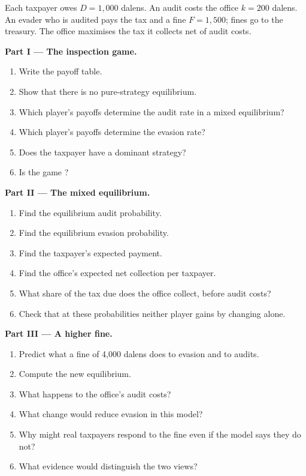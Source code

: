 \begin{problem}
\label{pb:b2:mixed-strategies:1}
Each taxpayer owes $D = 1{,}000$ dalens. An audit costs the office $k = 200$ dalens. An evader who is audited pays
the tax and a fine $F = 1{,}500$; fines go to the treasury. The office maximises the tax it collects net of audit
costs.

\medskip
\noindent\textbf{Part I --- The inspection game.}
\begin{enumerate}
  \item Write the payoff table.
  \item Show that there is no pure-strategy equilibrium.
  \item Which player's payoffs determine the audit rate in a mixed equilibrium?
  \item Which player's payoffs determine the evasion rate?
  \item Does the taxpayer have a dominant strategy?
  \item Is the game ?
\end{enumerate}

\medskip
\noindent\textbf{Part II --- The mixed equilibrium.}
\begin{enumerate}[resume]
  \item Find the equilibrium audit probability.
  \item Find the equilibrium evasion probability.
  \item Find the taxpayer's expected payment.
  \item Find the office's expected net collection per taxpayer.
  \item What share of the tax due does the office collect, before audit costs?
  \item Check that at these probabilities neither player gains by changing alone.
\end{enumerate}

\medskip
\noindent\textbf{Part III --- A higher fine.}
\begin{enumerate}[resume]
  \item Predict what a fine of 4{,}000 dalens does to evasion and to audits.
  \item Compute the new equilibrium.
  \item What happens to the office's audit costs?
  \item What change would reduce evasion in this model?
  \item Why might real taxpayers respond to the fine even if the model says they do not?
  \item What evidence would distinguish the two views?
\end{enumerate}


\end{problem}
